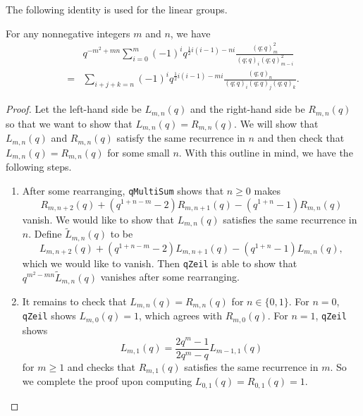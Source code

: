 The following identity is used for the linear groups.
\begin{proposition} \label{prop:gl-q-identity}
    For any nonnegative integers $m$ and $n$, we have
    \begin{align*}
        &q^{-m^{2}+mn}\sum_{i=0}^{m}\left(-1\right)^{i}q^{\frac{1}{2}i\left(i-1\right)-ni}\frac{\left(q;q\right)_m^{2}}{\left(q;q\right)_i\left(q;q\right)_{m-i}^{2}} \\
        ={}&\sum_{i+j+k=n}\left(-1\right)^{i}q^{\frac{1}{2}i\left(i-1\right)-mi}\frac{\left(q;q\right)_n}{\left(q;q\right)_i\left(q;q\right)_j\left(q;q\right)_k}.
    \end{align*}
\end{proposition}
\begin{proof}
    Let the left-hand side be $L_{m,n}(q)$ and the right-hand side be $R_{m,n}(q)$ so that we want to show that $L_{m,n}(q)=R_{m,n}(q)$. We will show that $L_{m,n}(q)$ and $R_{m,n}(q)$ satisfy the same recurrence in $n$ and then check that $L_{m,n}(q)=R_{m,n}(q)$ for some small $n$. With this outline in mind, we have the following steps.
    \begin{enumerate}
        \item After some rearranging, \texttt{qMultiSum} shows that $n\ge0$ makes
        \[R_{m,n+2}\left(q\right)+\left(q^{1+n-m}-2\right)R_{m,n+1}\left(q\right)-\left(q^{1+n}-1\right)R_{m,n}\left(q\right)\]
        vanish. We would like to show that $L_{m,n}(q)$ satisfies the same recurrence in $n$. Define $\widetilde L_{m,n}(q)$ to be
        \[L_{m,n+2}\left(q\right)+\left(q^{1+n-m}-2\right)L_{m,n+1}\left(q\right)-\left(q^{1+n}-1\right)L_{m,n}\left(q\right),\]
        which we would like to vanish. Then \texttt{qZeil} is able to show that $q^{m^2-mn}\widetilde L_{m,n}(q)$ vanishes after some rearranging.
        \item It remains to check that $L_{m,n}(q)=R_{m,n}(q)$ for $n\in\{0,1\}$. For $n=0$, \texttt{qZeil} shows $L_{m,0}(q)=1$, which agrees with $R_{m,0}(q)$. For $n=1$, \texttt{qZeil} shows
        \[L_{m,1}(q)=\frac{2q^m-1}{2q^m-q}L_{m-1,1}(q)\]
        for $m\ge1$ and checks that $R_{m,1}(q)$ satisfies the same recurrence in $m$. So we complete the proof upon computing $L_{0,1}(q)=R_{0,1}(q)=1$.
        \qedhere
    \end{enumerate}
\end{proof}
